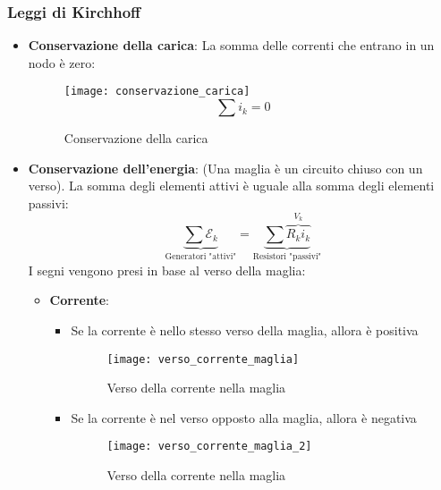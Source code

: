 \documentclass[a4paper]{article}
\begin{document}
\subsubsection{Leggi di Kirchhoff}
\begin{itemize}
  \item \textbf{Conservazione della carica}: La somma delle correnti che entrano in un nodo è
    zero:
    \begin{figure}[H]
      \centering
      \texttt{[image: conservazione\_carica]}
      \[
        \sum i_{k} = 0 
      \] 
      \caption{Conservazione della carica}
    \end{figure}
  \item \textbf{Conservazione dell'energia}: (Una maglia è un circuito chiuso con un verso).
    La somma degli elementi attivi è uguale alla somma degli elementi passivi:
    \[
      \underbrace{\sum \mathcal{E}_k}_{\text{Generatori "attivi"}} 
      = \underbrace{\sum \overbrace{R_k i_k}^{V_k}}_{\text{Resistori "passivi"}}
    \]
    I segni vengono presi in base al verso della maglia:
    \begin{itemize}
      \item \textbf{Corrente}:
        \begin{itemize}
          \item Se la corrente è nello stesso verso della maglia, allora è positiva
            \begin{figure}[H]
              \centering
              \texttt{[image: verso\_corrente\_maglia]}
              \caption{Verso della corrente nella maglia}
            \end{figure}

          \item Se la corrente è nel verso opposto alla maglia, allora è negativa
            \begin{figure}[H]
              \centering
              \texttt{[image: verso\_corrente\_maglia\_2]}
              \caption{Verso della corrente nella maglia}
            \end{figure}
        \end{itemize}


\end{itemize}
\end{itemize}
\end{document}
